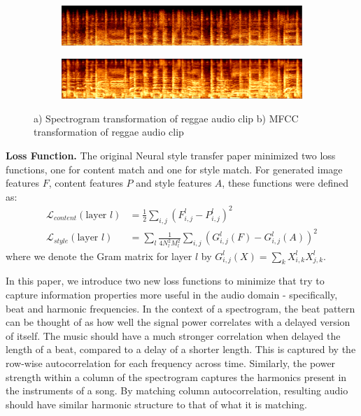 \documentclass{article}
\begin{document}
\begin{figure}[h]
\begin{subfigure}{\textwidth}
  \centering
  \includegraphics[width = \textwidth]{spec_example}
  \caption{}
\end{subfigure}
 \begin{subfigure}{\textwidth}
  \centering
  \includegraphics[width = \textwidth]{mel_example}
  \caption{}
\end{subfigure}
\caption{a) Spectrogram transformation of reggae audio clip b) MFCC transformation of reggae audio clip}
\end{figure}

\textbf{Loss Function.} \hspace{0.25cm} The original Neural style transfer paper minimized two loss functions, one for content match and one for style match. For generated image features $F$, content features $P$ and style features $A$, these functions were defined as:
\begin{align*}
\mathcal{L}_{content}(\text{layer } l) &= \frac{1}{2} \sum_{i, j} (F_{i, j}^{l} - P_{i, j}^{l})^2 \\
\mathcal{L}_{style}(\text{layer } l) &= \sum_l \frac{1}{4N_l^2M_l^2}\sum_{i,j}(G_{i,j}^l(F) - G_{i,j}^l(A))^2
\end{align*}
where we denote the Gram matrix for layer $l$ by $G_{i,j}^l(X) = \sum_k X_{i,k}^l X_{j,k}^l$. 

In this paper, we introduce two new loss functions to minimize that try to capture information properties more useful in the audio domain - specifically, beat and harmonic frequencies. In the context of a spectrogram, the beat pattern can be thought of as how well the signal power correlates with a delayed version of itself.  The music should have a much stronger correlation when delayed the length of a beat, compared to a delay of a shorter length. This is captured by the row-wise autocorrelation for each frequency across time. Similarly, the power strength within a column of the spectrogram captures the harmonics present in the instruments of a song. By matching column autocorrelation, resulting audio should have similar harmonic structure to that of what it is matching.
\end{document}

